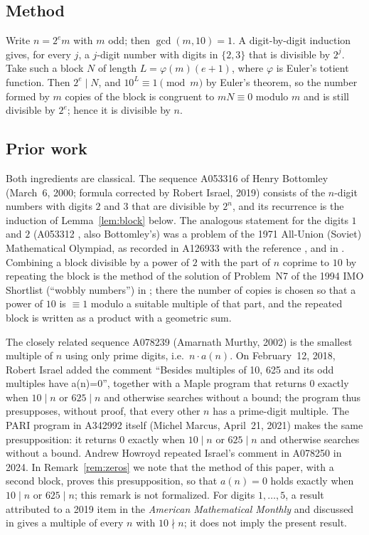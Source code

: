 \documentclass[11pt]{amsart}
\theoremstyle{plain}
\theoremstyle{definition}
\begin{document}
\subsection*{Method}
Write $n=2^em$ with $m$ odd; then $\gcd(m,10)=1$. A digit-by-digit induction gives, for every $j$, a $j$-digit number with digits in $\{2,3\}$ that is divisible by $2^j$. Take such a block $N$ of length $L=\varphi(m)(e+1)$, where $\varphi$ is Euler's totient function. Then $2^e\mid N$, and $10^L\equiv1\pmod m$ by Euler's theorem, so the number formed by $m$ copies of the block is congruent to $mN\equiv0$ modulo $m$ and is still divisible by $2^e$; hence it is divisible by $n$.

\subsection*{Prior work}
Both ingredients are classical. The sequence A053316 \cite{A053316} of Henry Bottomley (March~6, 2000; formula corrected by Robert Israel, 2019) consists of the $n$-digit numbers with digits $2$ and $3$ that are divisible by $2^n$, and its recurrence is the induction of Lemma~\ref{lem:block} below. The analogous statement for the digits $1$ and $2$ (A053312 \cite{A053312}, also Bottomley's) was a problem of the 1971 All-Union (Soviet) Mathematical Olympiad, as recorded in A126933 \cite{A126933} with the reference \cite{TT}, and in \cite{Bog}. Combining a block divisible by a power of $2$ with the part of $n$ coprime to $10$ by repeating the block is the method of the solution of Problem~N7 of the 1994 IMO Shortlist (``wobbly numbers'') in \cite{IMO94}; there the number of copies is chosen so that a power of $10$ is $\equiv1$ modulo a suitable multiple of that part, and the repeated block is written as a product with a geometric sum.

The closely related sequence A078239 \cite{A078239} (Amarnath Murthy, 2002) is the smallest multiple of $n$ using only prime digits, i.e.\ $n\cdot a(n)$. On February~12, 2018, Robert Israel added the comment ``Besides multiples of 10, 625 and its odd multiples have a(n)=0'', together with a Maple program that returns $0$ exactly when $10\mid n$ or $625\mid n$ and otherwise searches without a bound; the program thus presupposes, without proof, that every other $n$ has a prime-digit multiple. The PARI program in A342992 itself (Michel Marcus, April~21, 2021) makes the same presupposition: it returns $0$ exactly when $10\mid n$ or $625\mid n$ and otherwise searches without a bound. Andrew Howroyd repeated Israel's comment in A078250 \cite{A078250} in 2024. In Remark~\ref{rem:zeros} we note that the method of this paper, with a second block, proves this presupposition, so that $a(n)=0$ holds exactly when $10\mid n$ or $625\mid n$; this remark is not formalized. For digits $1,\dots,5$, a result attributed to a 2019 item in the \emph{American Mathematical Monthly} and discussed in \cite{Cook} gives a multiple of every $n$ with $10\nmid n$; it does not imply the present result.
\end{document}
